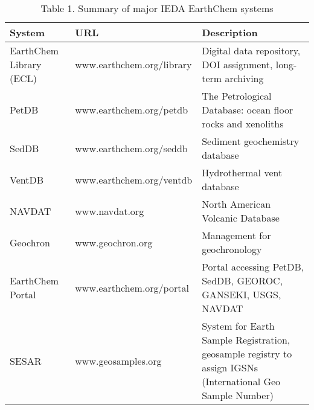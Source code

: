 \begin{table}[p]											
\caption{Table 1. Summary of major IEDA EarthChem systems}
\begin{tabular}{|l|l|l|}											
\hline											
System	&	URL	&	Description	 \\	
\hline											
\hline	
EarthChem Library (ECL)	&	www.earthchem.org/library	&	Digital data repository, DOI assignment, long-term archiving			\\
PetDB	&	www.earthchem.org/petdb	&	The Petrological Database: ocean floor rocks and xenoliths			\\
SedDB	&	www.earthchem.org/seddb	&	Sediment geochemistry database				\\
VentDB	&	www.earthchem.org/ventdb	&	Hydrothermal vent database			\\
NAVDAT	&	www.navdat.org 	&	North American Volcanic Database				\\
Geochron	&	www.geochron.org	&	Management for geochronology				\\
EarthChem Portal	&	www.earthchem.org/portal	&	Portal accessing PetDB, SedDB, GEOROC, GANSEKI, USGS, NAVDAT			\\
SESAR	&	www.geosamples.org	&	System for Earth Sample Registration, geosample registry to assign IGSNs (International Geo Sample Number)		\\
\hline											
\end{tabular}											
										
\end{table}